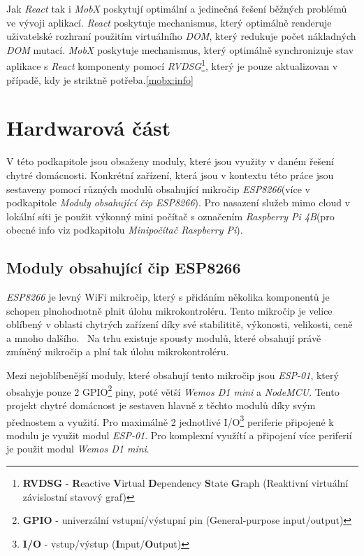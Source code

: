 Jak \emph{React} tak i \emph{MobX} poskytují optimální a jedinečná řešení běžných problémů ve vývoji aplikací.
\emph{React} poskytuje mechanismus, který optimálně renderuje uživatelské rozhraní použitím virtuálního \emph{DOM}, který redukuje počet nákladných \emph{DOM} mutací.
\emph{MobX} poskytuje mechanismus, který optimálně synchronizuje stav aplikace s \emph{React} komponenty pomocí
\emph{RVDSG}\footnote{\textbf{RVDSG} - \textbf{R}eactive \textbf{V}irtual \textbf{D}ependency \textbf{S}tate \textbf{G}raph (Reaktivní virtuální závislostní stavový graf)}, který je pouze aktualizovan v případě, kdy je striktně potřeba.\ref{mobx:info}

\newpage
\section{Hardwarová část}
\label{pouzite:hw}
V této podkapitole jsou obsaženy moduly, které jsou využity v daném řešení chytré domácnosti.
Konkrétní zařízení, která jsou v kontextu této práce jsou sestaveny pomocí různých modulů obsahující mikročip \emph{ESP8266}(více v podkapitole \emph{Moduly obsahující čip ESP8266}).
Pro nasazení služeb mimo cloud v lokální síti je použit výkonný mini počítač s označením \emph{Raspberry Pi 4B}(pro obecné info viz podkapitolu \emph{Minipočítač Raspberry Pi}).

\subsection*{Moduly obsahující čip ESP8266}
\label{terminy:esp8266}

\emph{ESP8266} je levný WiFi mikročip, který s přidáním několika komponentů je schopen plnohodnotně plnit úlohu mikrokontroléru.
Tento mikročip je velice oblíbený v oblasti chytrých zařízení díky své stabilititě, výkonosti, velikosti, ceně a mnoho dalšího.~\cite{wiki:esp}
Na trhu existuje spousty modulů, které obsahují právě zmíněný mikročip a plní tak úlohu mikrokontroléru.

Mezi nejoblíbenější moduly, které obsahují tento mikročip jsou \emph{ESP-01}, který obsahyje pouze 2 GPIO\footnote{\textbf{GPIO} - univerzální vstupní/výstupní pin (General-purpose input/output)} piny, poté větší \emph{Wemos D1 mini} a \emph{NodeMCU}.
Tento projekt chytré domácnost je sestaven hlavně z těchto modulů díky svým přednostem a využití.
Pro maximálně 2 jednotlivé I/O\footnote{\textbf{I/O} - vstup/výstup (\textbf{I}nput/\textbf{O}utput)} periferie připojené k modulu je využit modul \emph{ESP-01}.
Pro komplexní využítí a připojení více periferií je použit modul \emph{Wemos D1 mini}.

